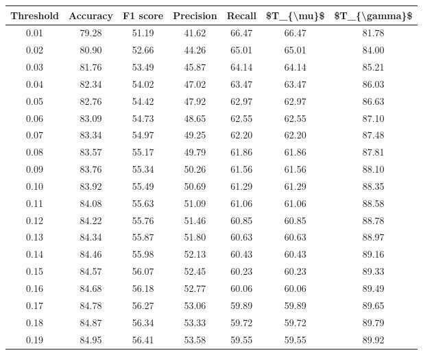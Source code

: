 \begin{tabular}{|c|c|c|c|c|c|c|}
\hline
 Threshold &  Accuracy &  F1 score &  Precision &  Recall &  \$T\_\{\textbackslash mu\}\$ &  \$T\_\{\textbackslash gamma\}\$ \\
\hline
      0.01 &     79.28 &     51.19 &      41.62 &   66.47 &      66.47 &         81.78 \\
      0.02 &     80.90 &     52.66 &      44.26 &   65.01 &      65.01 &         84.00 \\
      0.03 &     81.76 &     53.49 &      45.87 &   64.14 &      64.14 &         85.21 \\
      0.04 &     82.34 &     54.02 &      47.02 &   63.47 &      63.47 &         86.03 \\
      0.05 &     82.76 &     54.42 &      47.92 &   62.97 &      62.97 &         86.63 \\
      0.06 &     83.09 &     54.73 &      48.65 &   62.55 &      62.55 &         87.10 \\
      0.07 &     83.34 &     54.97 &      49.25 &   62.20 &      62.20 &         87.48 \\
      0.08 &     83.57 &     55.17 &      49.79 &   61.86 &      61.86 &         87.81 \\
      0.09 &     83.76 &     55.34 &      50.26 &   61.56 &      61.56 &         88.10 \\
      0.10 &     83.92 &     55.49 &      50.69 &   61.29 &      61.29 &         88.35 \\
      0.11 &     84.08 &     55.63 &      51.09 &   61.06 &      61.06 &         88.58 \\
      0.12 &     84.22 &     55.76 &      51.46 &   60.85 &      60.85 &         88.78 \\
      0.13 &     84.34 &     55.87 &      51.80 &   60.63 &      60.63 &         88.97 \\
      0.14 &     84.46 &     55.98 &      52.13 &   60.43 &      60.43 &         89.16 \\
      0.15 &     84.57 &     56.07 &      52.45 &   60.23 &      60.23 &         89.33 \\
      0.16 &     84.68 &     56.18 &      52.77 &   60.06 &      60.06 &         89.49 \\
      0.17 &     84.78 &     56.27 &      53.06 &   59.89 &      59.89 &         89.65 \\
      0.18 &     84.87 &     56.34 &      53.33 &   59.72 &      59.72 &         89.79 \\
      0.19 &     84.95 &     56.41 &      53.58 &   59.55 &      59.55 &         89.92 \\

\end{tabular}
